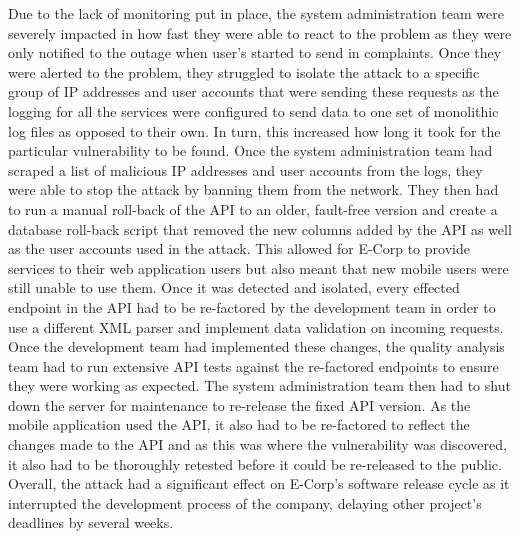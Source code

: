 \documentclass[]{report}
\begin{document}
Due to the lack of monitoring put in place, the system administration team were severely impacted in how fast they were able to react to the problem as they were only notified to the outage when user's started to send in complaints. Once they were alerted to the problem, they struggled to isolate the attack to a specific group of IP addresses and user accounts that were sending these requests as the logging for all the services were configured to send data to one set of monolithic log files as opposed to their own. In turn, this increased how long it took for the particular vulnerability to be found. Once the system administration team had scraped a list of malicious IP addresses and user accounts from the logs, they were able to stop the attack by banning them from the network. They then had to run a manual roll-back of the API to an older, fault-free version and create a database roll-back script that removed the new columns added by the API as well as the user accounts used in the attack. This allowed for E-Corp to provide services to their web application users but also meant that new mobile users were still unable to use them. Once it was detected and isolated, every effected endpoint in the API had to be re-factored by the development team in order to use a different XML parser and implement data validation on incoming requests. Once the development team had implemented these changes, the quality analysis team had to run extensive API tests against the re-factored endpoints to ensure they were working as expected. The system administration team then had to shut down the server for maintenance to re-release the fixed API version. As the mobile application used the API, it also had to be re-factored to reflect the changes made to the API and as this was where the vulnerability was discovered, it also had to be thoroughly retested before it could be re-released to the public. Overall, the attack had a significant effect on E-Corp's software release cycle as it interrupted the development process of the company, delaying other project's deadlines by several weeks. 
\end{document}
